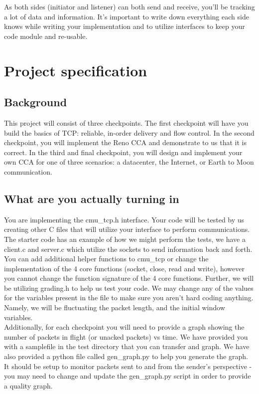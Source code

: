 As both sides (initiator and listener) can both send and receive, you'll be tracking a lot of data and information. It's important to write down everything each side knows while writing your implementation and to utilize interfaces to keep your code module and re-usable. 

\section{Project specification}
\subsection{Background}

This project will consist of three checkpoints. The first checkpoint will have you build the basics of TCP: reliable, in-order delivery and flow control. In the second checkpoint, you will implement the Reno CCA and demonstrate to us that it is correct. In the third and final checkpoint, you will design and implement your own CCA for one of three scenarios: a datacenter, the Internet, or Earth to Moon communication.

\subsection{What are you actually turning in}
You are implementing the cmu\_tcp.h interface. Your code will be tested by us creating other C files that will utilize your interface to perform communications. The starter code has an example of how we might perform the tests, we have a client.c and server.c which utilize the sockets to send information back and forth. You can add additional helper functions to cmu\_tcp or change the implementation of the 4 core functions (socket, close, read and write), however you cannot change the function signature of the 4 core functions. Further, we will be utilizing grading.h to help us test your code. We may change any of the values for the variables present in the file to make sure you aren't hard coding anything. Namely, we will be fluctuating the packet length, and the initial window variables. \\

Additionally, for each checkpoint you will need to provide a graph showing the number of packets in flight (or unacked packets) vs time. We have provided you with a samplefile in the test directory that you can transfer and graph. We have also provided a python file called gen\_graph.py to help you generate the graph. It should be setup to monitor packets sent to and from the sender's perspective - you may need to change and update the gen\_graph.py script in order to provide a quality graph. 


